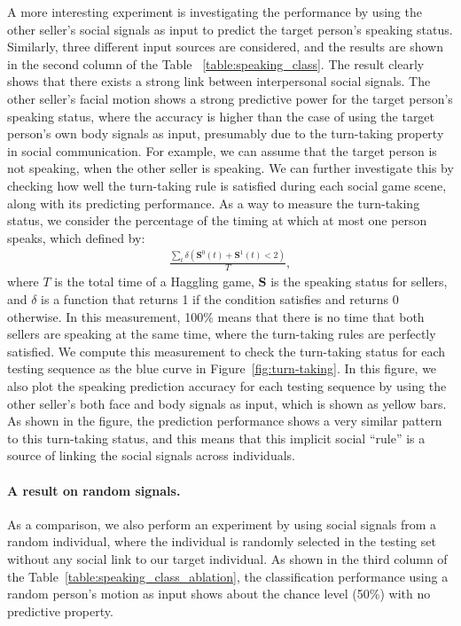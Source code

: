 A more interesting experiment is investigating the performance by using the other seller's social signals as input to predict the target person's speaking status. Similarly, three different input sources are considered, and the results are shown in the second column of the Table ~\ref{table:speaking_class}.  The result clearly shows that there exists a strong link between interpersonal social signals. The other seller's facial motion shows a strong predictive power for the target person's speaking status, where the accuracy is higher than the case of using the target person's own body signals as input, presumably due to the turn-taking property in social communication. For example, we can assume that the target person is not speaking, when the other seller is speaking. We can further investigate this by checking how well the turn-taking rule is satisfied during each social game scene, along with its predicting performance. As a way to measure the turn-taking status, we consider the percentage of the timing at which at most one person speaks, which defined by:
\begin{gather}	
\frac{\sum \limits_{t} \delta \left(\mathbf{S}^0(t) + \mathbf{S}^1(t) <2 \right)}{T},
\end{gather}
where $T$ is the total time of a Haggling game, $\mathbf{S}$ is the speaking status for sellers, and $\delta$ is a function that returns 1 if the condition satisfies and returns 0 otherwise. In this measurement, 100\% means that there is no time that both sellers are speaking at the same time, where the turn-taking rules are perfectly satisfied. We compute this measurement to check the turn-taking status for each testing sequence as the blue curve in Figure~\ref{fig:turn-taking}. In this figure, we also plot the speaking prediction accuracy for each testing sequence by using the other seller's both face and body signals as input, which is shown as yellow bars. As shown in the figure, the prediction performance shows a very similar pattern to this turn-taking status, and this means that this implicit social ``rule'' is a source of linking the social signals across individuals.



\paragraph{A result on random signals.}
As a comparison, we also perform an experiment by using social signals from a random individual, where the individual is randomly selected in the testing set without any social link to our target individual. As shown in the third column of the Table~\ref{table:speaking_class_ablation}, the classification performance using a random person's motion as input shows about the chance level (50\%) with no predictive property.


